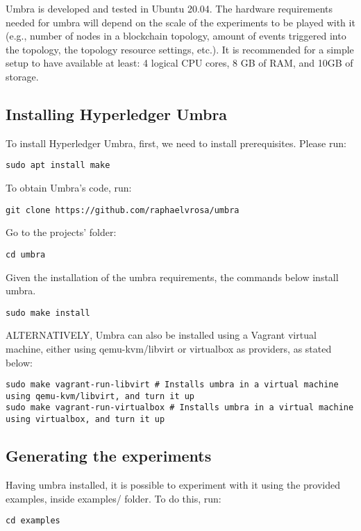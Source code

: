 \documentclass[12pt,a4paper]{article}
\theoremstyle{definition}
\begin{document}
Umbra is developed and tested in Ubuntu 20.04. The hardware requirements needed for umbra will depend on the scale of the experiments to be played with it (e.g., number of nodes in a blockchain topology, amount of events triggered into the topology, the topology resource settings, etc.). It is recommended for a simple setup to have available at least: 4 logical CPU cores, 8 GB of RAM, and 10GB of storage.


\subsection{Installing Hyperledger Umbra}
To install Hyperledger Umbra, first, we need to install prerequisites. Please run: 
\begin{verbatim}
sudo apt install make
\end{verbatim}

To obtain Umbra's code, run:
\begin{verbatim}
git clone https://github.com/raphaelvrosa/umbra
\end{verbatim}

Go to the projects' folder:
\begin{verbatim}
cd umbra
\end{verbatim}

Given the installation of the umbra requirements, the commands below install umbra.
\begin{verbatim}
sudo make install
\end{verbatim}

ALTERNATIVELY, Umbra can also be installed using a Vagrant virtual machine, either using qemu-kvm/libvirt or virtualbox as providers, as stated below:
\begin{verbatim}
sudo make vagrant-run-libvirt # Installs umbra in a virtual machine using qemu-kvm/libvirt, and turn it up
sudo make vagrant-run-virtualbox # Installs umbra in a virtual machine using virtualbox, and turn it up

\end{verbatim}

\subsection{Generating the experiments}
Having umbra installed, it is possible to experiment with it using the provided examples, inside examples/ folder. To do this, run:


\begin{verbatim}
cd examples
\end{verbatim}
\end{document}
